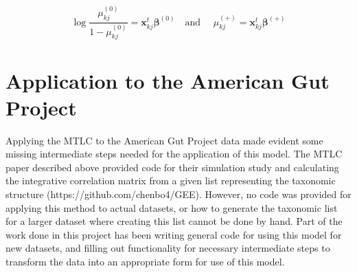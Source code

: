 \documentclass[12pt]{article}
\begin{document}
$$\log \frac{\mu_{kj}^{(0)}}{1 - \mu_{kj}^{(0)}} = \mathbf{x}_{kj}^t \boldsymbol\beta^{(0)} \quad \text{and } \quad \mu_{kj}^{(+)} = \mathbf{x}_{kj}^t \boldsymbol\beta^{(+)}$$




%
%
%


\section{Application to the American Gut Project}

Applying the MTLC to the American Gut Project data made evident some missing intermediate steps needed for the application of this model. The MTLC paper described above \cite{chen2020generalized} provided code for their simulation study and calculating the integrative correlation matrix from a given list representing the taxonomic structure (https://github.com/chenbo4/GEE). However, no code was provided for applying this method to actual datasets, or how to generate the taxonomic list for a larger dataset where creating this list cannot be done by hand. Part of the work done in this project has been writing general code for using this model for new datasets, and filling out functionality for necessary intermediate steps to transform the data into an appropriate form for use of this model.

\end{document}
